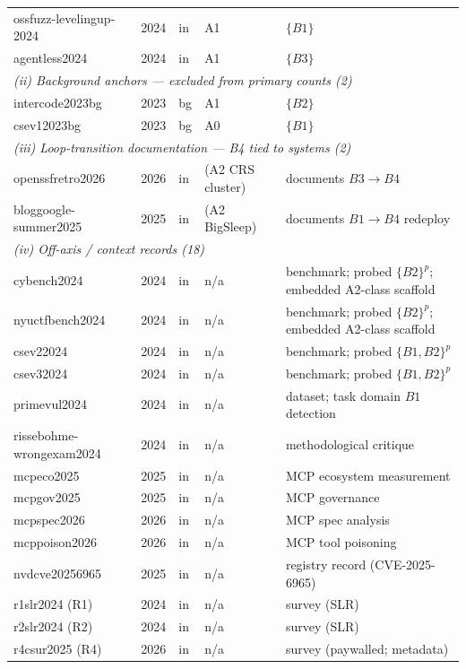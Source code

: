 \documentclass[conference,compsoc]{IEEEtran}
\begin{document}
\begin{table}[t]
{\begin{tabular}{lllll}
ossfuzz-levelingup-2024  & 2024 & in & A1        & $\{B1\}$ \\
agentless2024            & 2024 & in & A1        & $\{B3\}$ \\
\hline
\multicolumn{5}{l}{\emph{(ii) Background anchors --- excluded from primary counts (2)}}\\
intercode2023bg          & 2023 & bg & A1        & $\{B2\}$ \\
csev12023bg              & 2023 & bg & A0        & $\{B1\}$ \\
\hline
\multicolumn{5}{l}{\emph{(iii) Loop-transition documentation --- B4 tied to systems (2)}}\\
openssfretro2026         & 2026 & in & (A2 CRS cluster) & documents $B3{\to}B4$ \\
bloggoogle-summer2025    & 2025 & in & (A2 BigSleep)    & documents $B1{\to}B4$ redeploy \\
\hline
\multicolumn{5}{l}{\emph{(iv) Off-axis / context records (18)}}\\
cybench2024              & 2024 & in & n/a & benchmark; probed $\{B2\}^p$; embedded A2-class scaffold \\
nyuctfbench2024          & 2024 & in & n/a & benchmark; probed $\{B2\}^p$; embedded A2-class scaffold \\
csev22024                & 2024 & in & n/a & benchmark; probed $\{B1,B2\}^p$ \\
csev32024                & 2024 & in & n/a & benchmark; probed $\{B1,B2\}^p$ \\
primevul2024             & 2024 & in & n/a & dataset; task domain $B1$ detection \\
rissebohme-wrongexam2024           & 2024 & in & n/a & methodological critique \\
mcpeco2025               & 2025 & in & n/a & MCP ecosystem measurement \\
mcpgov2025               & 2025 & in & n/a & MCP governance \\
mcpspec2026              & 2026 & in & n/a & MCP spec analysis \\
mcppoison2026            & 2026 & in & n/a & MCP tool poisoning \\
nvdcve20256965           & 2025 & in & n/a & registry record (CVE-2025-6965) \\
r1slr2024 (R1)       & 2024 & in & n/a & survey (SLR) \\
r2slr2024 (R2) & 2024 & in & n/a & survey (SLR) \\
r4csur2025 (R4)       & 2026 & in & n/a & survey (paywalled; metadata) \\

\end{tabular}}
\end{table}
\end{document}
